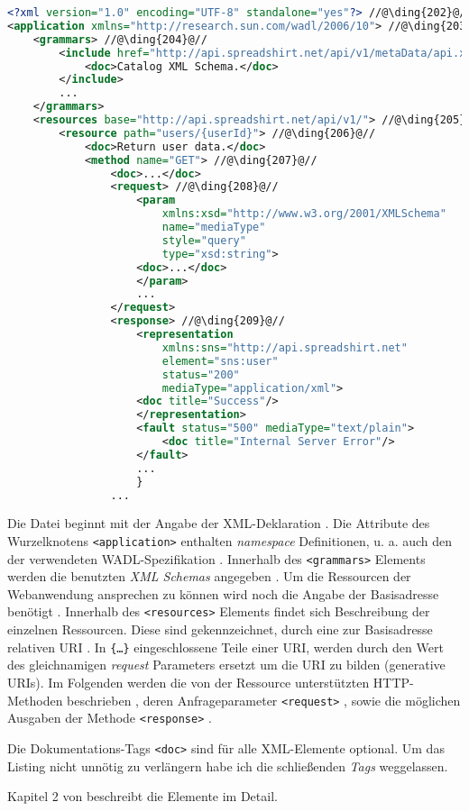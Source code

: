 \begin{lstlisting}[language=XML, caption={Beispielaufbau einer WADL-Datei anhand der Spreadshirt-API Beschreibung}, label=lst:wadlstructure, name=wadlstructure]
<?xml version="1.0" encoding="UTF-8" standalone="yes"?> //@\ding{202}@//
<application xmlns="http://research.sun.com/wadl/2006/10"> //@\ding{203}@//
    <grammars> //@\ding{204}@//
        <include href="http://api.spreadshirt.net/api/v1/metaData/api.xsd">
            <doc>Catalog XML Schema.</doc>
        </include>
        ...
    </grammars>
    <resources base="http://api.spreadshirt.net/api/v1/"> //@\ding{205}@//
        <resource path="users/{userId}"> //@\ding{206}@//
            <doc>Return user data.</doc>
            <method name="GET"> //@\ding{207}@//
                <doc>...</doc>
                <request> //@\ding{208}@//
                    <param 
                    	xmlns:xsd="http://www.w3.org/2001/XMLSchema" 
                    	name="mediaType" 
                    	style="query" 
                    	type="xsd:string">
                    <doc>...</doc>
                    </param>
                    ...
                </request>
                <response> //@\ding{209}@//
                    <representation 
                    	xmlns:sns="http://api.spreadshirt.net"
                    	element="sns:user" 
                    	status="200" 
                    	mediaType="application/xml">
                    <doc title="Success"/>
                    </representation>
                    <fault status="500" mediaType="text/plain">
                        <doc title="Internal Server Error"/>
                    </fault>
                   	...
                   	}
                ...
\end{lstlisting}

Die Datei beginnt mit der Angabe der XML-Deklaration .
Die Attribute des Wurzelknotens \texttt{<application>} enthalten \emph{namespace} Definitionen, u. a. auch den der verwendeten WADL-Spezifikation .
Innerhalb des \texttt{<grammars>} Elements werden die benutzten \emph{XML Schemas} angegeben . 
Um die Ressourcen der Webanwendung ansprechen zu können wird noch die Angabe der Basisadresse benötigt . 
Innerhalb des \texttt{<resources>} Elements findet sich Beschreibung der einzelnen Ressourcen. Diese sind gekennzeichnet, durch eine zur Basisadresse relativen \gls{URI} . In \texttt{\{\ldots\}} eingeschlossene Teile einer \gls{URI}, werden durch den Wert des gleichnamigen \emph{request} Parameters ersetzt um die URI zu bilden (generative URIs).
Im Folgenden werden die von der Ressource unterstützten HTTP-Methoden beschrieben , deren Anfrageparameter \texttt{<request>} , sowie die möglichen Ausgaben der Methode \texttt{<response>} .

Die Dokumentations-Tags \texttt{<doc>} sind für alle XML-Elemente optional.
Um das Listing nicht unnötig zu verlängern habe ich die schließenden \emph{Tags} weggelassen.

Kapitel 2 von \cite{hadleyWADL} beschreibt die Elemente im Detail.

